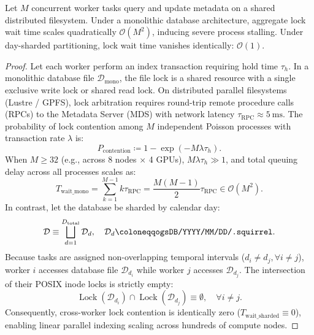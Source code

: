 \begin{theorem}
  \label{thm:supp_sqlite_sharding}
  Let $M$ concurrent worker tasks query and update metadata on a
  shared distributed filesystem.
  Under a monolithic database architecture, aggregate lock wait time
  scales quadratically $\mathcal{O}(M^2)$,
  inducing severe process stalling. Under day-sharded partitioning,
  lock wait time vanishes identically:
  $\mathcal{O}(1)$.
\end{theorem}

\begin{proof}
  Let each worker perform an index transaction requiring hold time $\tau_h$.
  In a monolithic database file $\mathcal{D}_{\mathrm{mono}}$, the
  file lock is a shared resource
  with a single exclusive write lock or shared read lock. On
  distributed parallel filesystems
  (Lustre / GPFS), lock arbitration requires round-trip remote
  procedure calls (RPCs) to the
  Metadata Server (MDS) with network latency $\tau_{\mathrm{RPC}}
  \approx \qty{5}{\milli\second}$.
  The probability of lock contention among $M$ independent Poisson
  processes with transaction rate $\lambda$ is:
  \begin{equation}
    P_{\mathrm{contention}} \coloneqq 1 - \exp(-M \lambda \tau_h).
    \label{eq:supp_lock_prob}
  \end{equation}
  When $M \ge \num{32}$ (e.g., across 8 nodes $\times$ 4 GPUs), $M
  \lambda \tau_h \gg 1$, and total
  queuing delay across all processes scales as:
  \begin{equation}
    T_{\mathrm{wait\_mono}} = \sum_{k=1}^{M-1} k \tau_{\mathrm{RPC}}
    = \frac{M(M - 1)}{2}\tau_{\mathrm{RPC}} \in \mathcal{O}(M^2).
    \label{eq:supp_mono_delay}
  \end{equation}
  In contrast, let the database be sharded by calendar day:
  \begin{equation}
    \mathcal{D} \equiv \bigsqcup_{d=1}^{D_{\mathrm{total}}}
    \mathcal{D}_d, \quad \mathcal{D}_d \coloneqq
    \text{\texttt{ogsDB/YYYY/MM/DD/.squirrel}}.
    \label{eq:supp_sharded_db}
  \end{equation}
  Because tasks are assigned non-overlapping temporal intervals
  ($d_i \ne d_j, \forall i \ne j$),
  worker $i$ accesses database file $\mathcal{D}_{d_i}$ while worker
  $j$ accesses $\mathcal{D}_{d_j}$.
  The intersection of their POSIX inode locks is strictly empty:
  \begin{equation}
    \operatorname{Lock}(\mathcal{D}_{d_i}) \cap
    \operatorname{Lock}(\mathcal{D}_{d_j}) \equiv \emptyset, \quad
    \forall i \ne j.
    \label{eq:supp_disjoint_locks}
  \end{equation}
  Consequently, cross-worker lock contention is identically zero
  ($T_{\mathrm{wait\_sharded}} \equiv 0$),
  enabling linear parallel indexing scaling across hundreds of compute nodes.
\end{proof}

